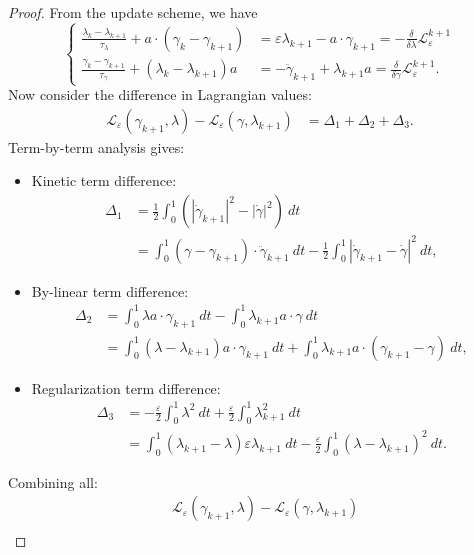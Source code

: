 \documentclass[10pt,a4paper]{amsart}
\begin{document}
\begin{proof}
From the update scheme, we have 
\[\begin{cases}
    \frac{\lambda_k -\lambda_{k+1}}{\tau_{\lambda}}+ a\cdot(\gamma_k - \gamma_{k+1}) &= \varepsilon\lambda_{k+1}-a\cdot \gamma_{k+1} = -\frac{\delta}{\delta\lambda}\mathcal{L}_{\varepsilon}^{k+1}\\
    \frac{\gamma_k - \gamma_{k+1}}{\tau_{\gamma}} + (\lambda_k-\lambda_{k+1}) a & = -\ddot{\gamma}_{k+1}+\lambda_{k+1}a = \frac{\delta}{\delta\gamma}\mathcal{L}_{\varepsilon}^{k+1}.
\end{cases}\]
Now consider the difference in Lagrangian values:
\begin{align*}
    \mathcal{L}_{\varepsilon}(\gamma_{k+1},\lambda) - \mathcal{L}_{\varepsilon}(\gamma,\lambda_{k+1}) & = \Delta_1 + \Delta_2 + \Delta_3.
\end{align*}
Term-by-term analysis gives:
\begin{itemize}
    \item Kinetic term difference:
    \begin{align*}
    \Delta_1 & = \frac{1}{2}\int_0^1\left(|\dot{\gamma}_{k+1}|^2 -|\dot{\gamma}|^2\right)~dt\\
    & = \int_0^1 (\gamma-\gamma_{k+1})\cdot\ddot{\gamma}_{k+1}~dt - \frac{1}{2}\int_0^1|\dot{\gamma}_{k+1}-\dot{\gamma}|^2~dt,
\end{align*}
\item By-linear term difference: 
\begin{align*}
    \Delta_2 & = \int_0^1 \lambda a\cdot \gamma_{k+1}~dt -\int_0^1 \lambda_{k+1}a\cdot \gamma~dt\\
     & = \int_0^1 (\lambda - \lambda_{k+1})a\cdot \gamma_{k+1}~dt + \int_0^1\lambda_{k+1}a\cdot (\gamma_{k+1}-\gamma)~dt,
\end{align*}
\item Regularization term difference: 
\begin{align*}
    \Delta_3 & = -\frac{\varepsilon}{2}\int_0^1 \lambda^2~dt + \frac{\varepsilon}{2}\int_0^1 \lambda_{k+1}^2~dt\\
    & = \int_0^1(\lambda_{k+1} - \lambda)\varepsilon\lambda_{k+1}~dt - \frac{\varepsilon}{2}\int_0^1 (\lambda- \lambda_{k+1})^2~dt.
\end{align*}
\end{itemize}
Combining all:
\begin{align*}
    & \mathcal{L}_{\varepsilon}(\gamma_{k+1},\lambda) - \mathcal{L}_{\varepsilon}(\gamma,\lambda_{k+1}) \\

\end{align*}
\end{proof}
\end{document}
